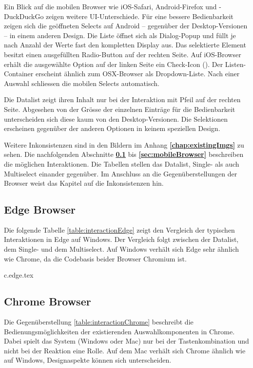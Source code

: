 Ein Blick auf die mobilen Browser wie iOS-Safari, Android-Firefox und -DuckDuckGo zeigen weitere UI-Unterschiede. 
Für eine bessere Bedienbarkeit zeigen sich die geöffneten Selects auf Android – gegenüber der Desktop-Versionen – in einem anderen Design. 
Die Liste öffnet sich als Dialog-Popup und füllt je nach Anzahl der Werte fast den kompletten Display aus. 
Das selektierte Element besitzt einen ausgefüllten Radio-Button auf der rechten Seite. 
Auf iOS-Browser erhält die ausgewählte Option auf der linken Seite ein Check-Icon (\cmark). 
Der Listen-Container erscheint ähnlich zum OSX-Browser als Dropdown-Liste. 
Nach einer Auswahl schliessen die mobilen Selects automatisch. 

Die Datalist zeigt ihren Inhalt nur bei der Interaktion mit Pfeil auf der rechten Seite. 
Abgesehen von der Grösse der einzelnen Einträge für die Bedienbarkeit unterscheiden sich diese kaum von den Desktop-Versionen.
Die Selektionen erscheinen gegenüber der anderen Optionen in keinem speziellen Design. 

Weitere Inkonsistenzen sind in den Bildern im Anhang \textbf{\ref{chap:existingImgs}} zu sehen. 
Die nachfolgenden Abschnitte \textbf{\ref{sec:edgeBrowser}} bis \textbf{\ref{sec:mobileBrowser}} beschreiben die möglichen Interaktionen. 
Die Tabellen stellen das Datalist, Single- als auch Multiselect einander gegenüber. 
Im Anschluss an die Gegenüberstellungen der Browser weist das Kapitel \textbf{} auf die Inkonsistenzen hin. 


\clearpage
\subsection{Edge Browser}
\label{sec:edgeBrowser}

Die folgende Tabelle \ref{table:interactionEdge} zeigt den Vergleich der typischen Interaktionen in Edge auf Windows. 
Der Vergleich folgt zwischen der Datalist, dem Single- und dem Multiselect. 
Auf Windows verhält sich Edge sehr ähnlich wie Chrome, da die Codebasis beider Browser Chromium ist. 

{c.edge.tex}


\clearpage
\subsection{Chrome Browser}
\label{sec:chromeBrowser}

Die Gegenüberstellung \ref{table:interactionChrome} beschreibt die Bedienungsmöglichkeiten der existierenden Auswahlkomponenten in Chrome. 
Dabei spielt das System (Windows oder Mac) nur bei der Tastenkombination und nicht bei der Reaktion eine Rolle. 
Auf dem Mac verhält sich Chrome ähnlich wie auf Windows, Designaspekte können sich unterscheiden. 

